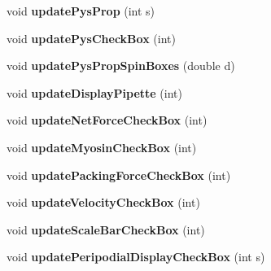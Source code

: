\begin{DoxyCompactItemize}
\item 
\hypertarget{classMainWindow_a524bf8d075a209be107c5ee9cd750bba}{}void {\bfseries update\+Pys\+Prop} (int s)\label{classMainWindow_a524bf8d075a209be107c5ee9cd750bba}

\item 
\hypertarget{classMainWindow_a933538d0ccf6de1298c6e4c7ed223f38}{}void {\bfseries update\+Pys\+Check\+Box} (int)\label{classMainWindow_a933538d0ccf6de1298c6e4c7ed223f38}

\item 
\hypertarget{classMainWindow_acd6a8996cd12c70a0e0572eebb9dc24d}{}void {\bfseries update\+Pys\+Prop\+Spin\+Boxes} (double d)\label{classMainWindow_acd6a8996cd12c70a0e0572eebb9dc24d}

\item 
\hypertarget{classMainWindow_ad30193e1dac5d64c7467e576e238ce03}{}void {\bfseries update\+Display\+Pipette} (int)\label{classMainWindow_ad30193e1dac5d64c7467e576e238ce03}

\item 
\hypertarget{classMainWindow_ac6e570780295db3ff54382cbda1ea4cf}{}void {\bfseries update\+Net\+Force\+Check\+Box} (int)\label{classMainWindow_ac6e570780295db3ff54382cbda1ea4cf}

\item 
\hypertarget{classMainWindow_a6d97f5be9f61304b31db8f83d11f6b8d}{}void {\bfseries update\+Myosin\+Check\+Box} (int)\label{classMainWindow_a6d97f5be9f61304b31db8f83d11f6b8d}

\item 
\hypertarget{classMainWindow_abf1716feb02925cadc40800ed5aa1af8}{}void {\bfseries update\+Packing\+Force\+Check\+Box} (int)\label{classMainWindow_abf1716feb02925cadc40800ed5aa1af8}

\item 
\hypertarget{classMainWindow_a0860bef7bbd9ae81c607142a8462e0a7}{}void {\bfseries update\+Velocity\+Check\+Box} (int)\label{classMainWindow_a0860bef7bbd9ae81c607142a8462e0a7}

\item 
\hypertarget{classMainWindow_af7f60ea4eea7ff11fd1f892455d86063}{}void {\bfseries update\+Scale\+Bar\+Check\+Box} (int)\label{classMainWindow_af7f60ea4eea7ff11fd1f892455d86063}

\item 
\hypertarget{classMainWindow_aee2509de2d13eedd782420cf86cd34d6}{}void {\bfseries update\+Peripodial\+Display\+Check\+Box} (int s)\label{classMainWindow_aee2509de2d13eedd782420cf86cd34d6}


\end{DoxyCompactItemize}
